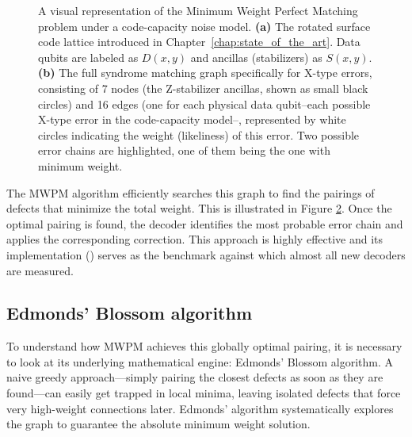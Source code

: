 \begin{figure}[hbt!]
    \centering
    \begin{subfigure}[b]{0.45\textwidth}
        \centering
        \resizebox{\linewidth}{!}{
        
        }
        \caption{}
        \label{fig:mwpm_lattice}
    \end{subfigure}
    \hfill
    \begin{subfigure}[b]{0.45\textwidth}
        \centering
        \resizebox{\linewidth}{!}{
        
        }
        \caption{}
        \label{fig:mwpm_graph}
    \end{subfigure}
    
    \caption[A visual representation of the Minimum Weight Perfect Matching problem.]{A visual representation of the Minimum Weight Perfect Matching problem under a code-capacity noise model. \textbf{(a)} The rotated surface code lattice introduced in Chapter~\ref{chap:state_of_the_art}. Data qubits are labeled as $D(x,y)$ and ancillas (stabilizers) as $S(x,y)$. \textbf{(b)} The full syndrome matching graph specifically for X-type errors, consisting of 7 nodes (the Z-stabilizer ancillas, shown as small black circles) and 16 edges (one for each physical data qubit--each possible X-type error in the code-capacity model--, represented by white circles indicating the weight (likeliness) of this error. Two possible error chains are highlighted, one of them being the one with minimum weight.}
    \label{fig:4:mwpm_example}
\end{figure}

The MWPM algorithm efficiently searches this graph to find the pairings of defects that minimize the total weight. This is illustrated in Figure \ref{fig:mwpm_graph}. Once the optimal pairing is found, the decoder identifies the most probable error chain and applies the corresponding correction. This approach is highly effective and its implementation (\cite{higgott2022pymatching}) serves as the benchmark against which almost all new decoders are measured.

\subsection{Edmonds' Blossom algorithm}
To understand how MWPM achieves this globally optimal pairing, it is necessary to look at its underlying mathematical engine: Edmonds' Blossom algorithm. A naive greedy approach—simply pairing the closest defects as soon as they are found—can easily get trapped in local minima, leaving isolated defects that force very high-weight connections later. Edmonds' algorithm systematically explores the graph to guarantee the absolute minimum weight solution.

